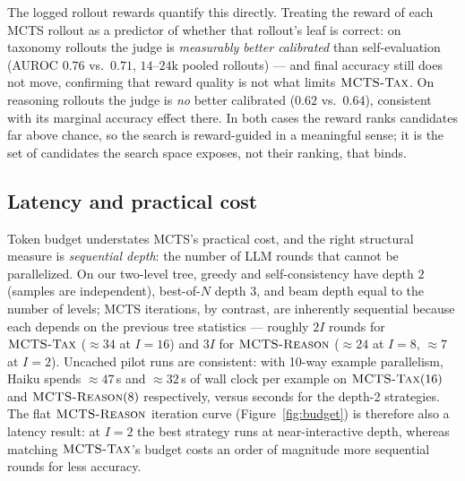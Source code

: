 The logged rollout rewards quantify this directly. Treating the reward of each
MCTS rollout as a predictor of whether that rollout's leaf is correct: on
taxonomy rollouts the judge is \emph{measurably better calibrated} than
self-evaluation (AUROC $0.76$ vs.\ $0.71$, $14$--$24$k pooled rollouts) --- and
final accuracy still does not move, confirming that reward quality is not what
limits $\textsc{MCTS-Tax}$. On reasoning rollouts the judge is \emph{no} better
calibrated ($0.62$ vs.\ $0.64$), consistent with its marginal accuracy effect
there. In both cases the reward ranks candidates far above chance, so the
search is reward-guided in a meaningful sense; it is the set of candidates the
search space exposes, not their ranking, that binds.

\subsection{Latency and practical cost}
Token budget understates MCTS's practical cost, and the right structural
measure is \emph{sequential depth}: the number of LLM rounds that cannot be
parallelized. On our two-level tree, greedy and self-consistency have depth $2$
(samples are independent), best-of-$N$ depth $3$, and beam depth equal to the
number of levels; MCTS iterations, by contrast, are inherently sequential
because each depends on the previous tree statistics --- roughly $2I$ rounds
for $\textsc{MCTS-Tax}$ ($\approx\!34$ at $I{=}16$) and $3I$ for $\textsc{MCTS-Reason}$
($\approx\!24$ at $I{=}8$, $\approx\!7$ at $I{=}2$). Uncached pilot runs are
consistent: with 10-way example parallelism, Haiku spends $\approx\!47$\,s and
$\approx\!32$\,s of wall clock per example on $\textsc{MCTS-Tax}(16)$ and
$\textsc{MCTS-Reason}(8)$ respectively, versus seconds for the depth-2 strategies. The
flat $\textsc{MCTS-Reason}$ iteration curve (Figure~\ref{fig:budget}) is therefore also a
latency result: at $I{=}2$ the best strategy runs at near-interactive depth,
whereas matching $\textsc{MCTS-Tax}$'s budget costs an order of magnitude more
sequential rounds for less accuracy.

